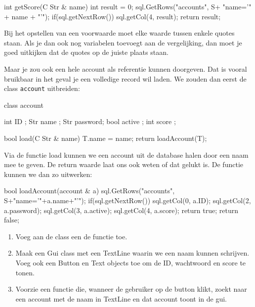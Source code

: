 \begin{code}
int getScore(C Str & name) {
  int result = 0;
	sql.GetRows("accounts", S+ "name='" + name + "'");
	if(sql.getNextRow()) {
	  sql.getCol(4, result);
	}
	return result;
}
\end{code}

\begin{note}
Bij het opstellen van een voorwaarde moet elke waarde tussen enkele quotes staan. Als je dan ook nog variabelen toevoegt aan de vergelijking, dan moet je goed uitkijken dat de quotes op de juiste plaats staan.
\end{note}

Maar je zou ook een hele account als referentie kunnen doorgeven. Dat is vooral bruikbaar in het geval je een volledige record wil laden. We zouden dan eerst de class \texttt{account} uitbreiden:

\begin{code}
class account {
	int  ID      ;
	Str  name    ;
	Str  password;
	bool active  ;
	int  score   ;
	
	bool load(C Str & name) {
		T.name = name;
	  return loadAccount(T);
	}
}
\end{code}

Via de functie load kunnen we een account uit de database halen door een naam mee te geven. De return waarde laat ons ook weten of dat gelukt is. De functie  kunnen we dan zo uitwerken:

\begin{code}
bool loadAccount(account & a) {
  sql.GetRows("accounts", S+"name='"+a.name+"'");
	if(sql.getNextRow()) {
		sql.getCol(0, a.ID);
		sql.getCol(2, a.password);
		sql.getCol(3, a.active);
		sql.getCol(4, a.score);
		return true;
  }
	return false;
}
\end{code}

\begin{exercise}
	\begin{enumerate}
		\item Voeg aan de class  een de functie  toe.
		\item Maak een Gui class met een TextLine waarin we een naam kunnen schrijven. Voeg ook een Button en Text objects toe om de ID, wachtwoord en score te tonen.
		\item Voorzie een functie die, wanneer de gebruiker op de button klikt, zoekt naar een account met de naam in TextLine en dat account toont in de gui.
	\end{enumerate}
\end{exercise}

